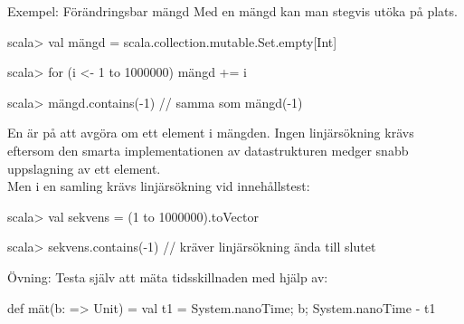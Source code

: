 \begin{Slide}{Exempel: Förändringsbar mängd}\SlideFontSmall
Med en  mängd kan man stegvis utöka på plats.
\begin{REPL}
scala> val mängd = scala.collection.mutable.Set.empty[Int]

scala> for (i <- 1 to 1000000) mängd += i

scala> mängd.contains(-1)                     // samma som mängd(-1)
\end{REPL}
En  är  på att avgöra om ett element  i mängden. Ingen linjärsökning krävs eftersom den smarta implementationen av datastrukturen medger snabb uppslagning  av ett element.
\pause
\\\vspace{0.5em}Men i en samling krävs linjärsökning vid innehållstest:
\begin{REPL}
scala> val sekvens = (1 to 1000000).toVector

scala> sekvens.contains(-1)   // kräver linjärsökning ända till slutet
\end{REPL}
\pause\SlideFontTiny Övning: Testa själv att mäta tidsskillnaden med hjälp av:
\begin{Code}
def mät(b: => Unit) = 
  { val t1 = System.nanoTime; b; System.nanoTime - t1 }
\end{Code}

\end{Slide}








